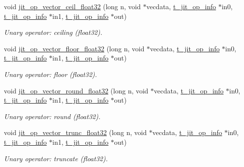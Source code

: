 \begin{DoxyCompactItemize}
void \hyperlink{group__opvecmod_gaa3b54514a3ba3b8e6a32e7111fe1f41c}{jit\_\-op\_\-vector\_\-ceil\_\-float32} (long n, void $\ast$vecdata, \hyperlink{structt__jit__op__info}{t\_\-jit\_\-op\_\-info} $\ast$in0, \hyperlink{structt__jit__op__info}{t\_\-jit\_\-op\_\-info} $\ast$in1, \hyperlink{structt__jit__op__info}{t\_\-jit\_\-op\_\-info} $\ast$out)
\begin{DoxyCompactList}\small\item\em Unary operator: ceiling (float32). \item\end{DoxyCompactList}\item 
void \hyperlink{group__opvecmod_gadaa5adf436030792049ca43566a6894c}{jit\_\-op\_\-vector\_\-floor\_\-float32} (long n, void $\ast$vecdata, \hyperlink{structt__jit__op__info}{t\_\-jit\_\-op\_\-info} $\ast$in0, \hyperlink{structt__jit__op__info}{t\_\-jit\_\-op\_\-info} $\ast$in1, \hyperlink{structt__jit__op__info}{t\_\-jit\_\-op\_\-info} $\ast$out)
\begin{DoxyCompactList}\small\item\em Unary operator: floor (float32). \item\end{DoxyCompactList}\item 
void \hyperlink{group__opvecmod_gaeb9f22a39d68084655686f4af6cace3c}{jit\_\-op\_\-vector\_\-round\_\-float32} (long n, void $\ast$vecdata, \hyperlink{structt__jit__op__info}{t\_\-jit\_\-op\_\-info} $\ast$in0, \hyperlink{structt__jit__op__info}{t\_\-jit\_\-op\_\-info} $\ast$in1, \hyperlink{structt__jit__op__info}{t\_\-jit\_\-op\_\-info} $\ast$out)
\begin{DoxyCompactList}\small\item\em Unary operator: round (float32). \item\end{DoxyCompactList}\item 
void \hyperlink{group__opvecmod_ga7b55e59d347017d8ef5169243774a3a2}{jit\_\-op\_\-vector\_\-trunc\_\-float32} (long n, void $\ast$vecdata, \hyperlink{structt__jit__op__info}{t\_\-jit\_\-op\_\-info} $\ast$in0, \hyperlink{structt__jit__op__info}{t\_\-jit\_\-op\_\-info} $\ast$in1, \hyperlink{structt__jit__op__info}{t\_\-jit\_\-op\_\-info} $\ast$out)
\begin{DoxyCompactList}\small\item\em Unary operator: truncate (float32). \item\end{DoxyCompactList}\item 

\end{DoxyCompactItemize}
